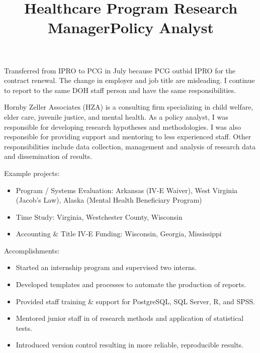 \documentclass[line, mm, 10pt]{res}
\begin{document}
\begin{resume}
  \title{Healthcare Program Research Manager}
  \begin{position}
    Transferred from IPRO to PCG in July because PCG outbid IPRO for
    the contract renewal. The change in employer and job title are
    misleading. I continue to report to the same DOH staff person and
    have the same responsibilities.
  \end{position}

  \title{Policy Analyst}
  \begin{position}
    Hornby Zeller Associates (HZA) is a consulting firm specializing
    in child welfare, elder care, juvenile justice, and mental
    health. As a policy analyst, I was responsible for developing
    research hypotheses and methodologies. I was also responsible for
    providing support and mentoring to less experienced staff. Other
    responsibilities include data collection, management and analysis
    of research data and dissemination of results.

    Example projects:
    \begin{itemize}
    \item Program / Systems Evaluation: Arkansas (IV-E Waiver), West
      Virginia (Jacob's Law), Alaska (Mental Health Beneficiary Program)
    \item Time Study: Virginia, Westchester County, Wisconsin
    \item Accounting \& Title IV-E Funding: Wisconsin, Georgia, Mississippi
    \end{itemize}

    Accomplishments:
    \begin{itemize}
    \item Started an internship program and supervised two interns.
    \item Developed templates and processes to automate the production
      of reports.
    \item Provided staff training \& support for PostgreSQL, SQL
      Server, R, and SPSS.
    \item Mentored junior staff in of research methods and application
      of statistical tests.
    \item Introduced version control resulting in more reliable, reproducible results.
    \end{itemize}
  \end{position}


\end{resume}
\end{document}
